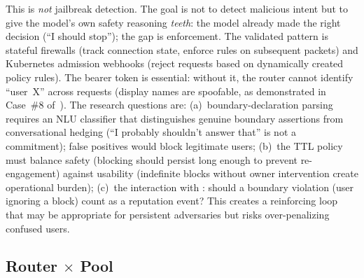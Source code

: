 \begin{opportunity}
\begin{frisk}
This is \emph{not} jailbreak detection.  The goal is not to detect
malicious intent but to give the model's own safety reasoning
\emph{teeth}: the model already made the right decision (``I should
stop''); the gap is enforcement.  The validated pattern is stateful
firewalls (track connection state, enforce rules on subsequent
packets) and Kubernetes admission webhooks (reject requests based on
dynamically created policy rules).  The bearer token is essential:
without it, the router cannot identify ``user~X'' across requests
(display names are spoofable, as demonstrated in Case~\#8
of~\cite{agentschaos2025}).  The research questions are:
(a)~boundary-declaration parsing requires an NLU classifier that
distinguishes genuine boundary assertions from conversational
hedging (``I probably shouldn't answer that'' is not a commitment);
false positives would block legitimate users;
(b)~the TTL policy must balance safety (blocking should persist long
enough to prevent re-engagement) against usability (indefinite blocks
without owner intervention create operational burden);
(c)~the interaction with : should a
boundary violation (user ignoring a block) count as a reputation
event?  This creates a reinforcing loop that may be appropriate for
persistent adversaries but risks over-penalizing confused users.
\end{frisk}
\end{opportunity}


\subsection{Router $\times$ Pool}

